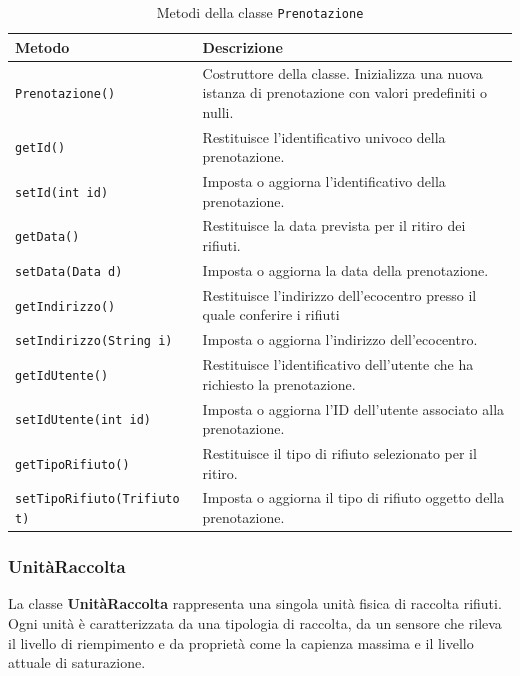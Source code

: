 \begin{table}[H]
\centering
\begin{tabularx}{\textwidth}{|l|X|}
\hline
\textbf{Metodo} & \textbf{Descrizione} \\
\hline
\texttt{Prenotazione()} & Costruttore della classe. Inizializza una nuova istanza di prenotazione con valori predefiniti o nulli. \\
\hline
\texttt{getId()} & Restituisce l’identificativo univoco della prenotazione. \\
\hline
\texttt{setId(int id)} & Imposta o aggiorna l’identificativo della prenotazione. \\
\hline
\texttt{getData()} & Restituisce la data prevista per il ritiro dei rifiuti. \\
\hline
\texttt{setData(Data d)} & Imposta o aggiorna la data della prenotazione. \\
\hline
\texttt{getIndirizzo()} & Restituisce l’indirizzo dell'ecocentro presso il quale conferire i rifiuti \\
\hline
\texttt{setIndirizzo(String i)} & Imposta o aggiorna l’indirizzo dell'ecocentro. \\
\hline
\texttt{getIdUtente()} & Restituisce l’identificativo dell’utente che ha richiesto la prenotazione. \\
\hline
\texttt{setIdUtente(int id)} & Imposta o aggiorna l’ID dell’utente associato alla prenotazione. \\
\hline
\texttt{getTipoRifiuto()} & Restituisce il tipo di rifiuto selezionato per il ritiro. \\
\hline
\texttt{setTipoRifiuto(Trifiuto t)} & Imposta o aggiorna il tipo di rifiuto oggetto della prenotazione. \\
\hline
\end{tabularx}
\caption{Metodi della classe \texttt{Prenotazione}}
\end{table}

\subsubsection{UnitàRaccolta}

La classe \textbf{UnitàRaccolta} rappresenta una singola unità fisica di raccolta rifiuti. Ogni unità è caratterizzata da una tipologia di raccolta, da un sensore che rileva il livello di riempimento e da proprietà come la capienza massima e il livello attuale di saturazione.

